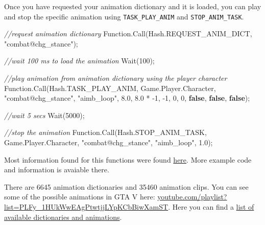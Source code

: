 \documentclass[
  openany]{book}
\newenvironment{Shaded}{\begin{snugshade}}{\end{snugshade}}
\newcommand{\CommentTok}[1]{\textcolor[rgb]{0.56,0.35,0.01}{\textit{#1}}}
\newcommand{\DecValTok}[1]{\textcolor[rgb]{0.00,0.00,0.81}{#1}}
\newcommand{\FloatTok}[1]{\textcolor[rgb]{0.00,0.00,0.81}{#1}}
\newcommand{\FunctionTok}[1]{\textcolor[rgb]{0.00,0.00,0.00}{#1}}
\newcommand{\KeywordTok}[1]{\textcolor[rgb]{0.13,0.29,0.53}{\textbf{#1}}}
\newcommand{\NormalTok}[1]{#1}
\newcommand{\StringTok}[1]{\textcolor[rgb]{0.31,0.60,0.02}{#1}}
\begin{document}
Once you have requested your animation dictionary and it is loaded, you can play and stop the specific animation using \texttt{TASK\_PLAY\_ANIM} and \texttt{STOP\_ANIM\_TASK}.

\begin{Shaded}
\begin{Highlighting}[]
\CommentTok{//request animation dictionary}
\NormalTok{Function.}\FunctionTok{Call}\NormalTok{(Hash.}\FunctionTok{REQUEST_ANIM_DICT}\NormalTok{, }\StringTok{"combat@chg_stance"}\NormalTok{);}
 
\CommentTok{//wait 100 ms to load the animation}
\FunctionTok{Wait}\NormalTok{(}\DecValTok{100}\NormalTok{);}
 
\CommentTok{//play animation from animation dictionary using the player character}
\NormalTok{Function.}\FunctionTok{Call}\NormalTok{(Hash.}\FunctionTok{TASK_PLAY_ANIM}\NormalTok{, Game.}\FunctionTok{Player}\NormalTok{.}\FunctionTok{Character}\NormalTok{, }\StringTok{"combat@chg_stance"}\NormalTok{, }\StringTok{"aimb_loop"}\NormalTok{, }\FloatTok{8.0}\NormalTok{, }\FloatTok{8.0}\NormalTok{ * }\DecValTok{-1}\NormalTok{, }\DecValTok{-1}\NormalTok{, }\DecValTok{0}\NormalTok{, }\DecValTok{0}\NormalTok{, }\KeywordTok{false}\NormalTok{, }\KeywordTok{false}\NormalTok{, }\KeywordTok{false}\NormalTok{);}
 
\CommentTok{//wait 5 secs}
\FunctionTok{Wait}\NormalTok{(}\DecValTok{5000}\NormalTok{);}
 
\CommentTok{//stop the animation}
\NormalTok{Function.}\FunctionTok{Call}\NormalTok{(Hash.}\FunctionTok{STOP_ANIM_TASK}\NormalTok{, Game.}\FunctionTok{Player}\NormalTok{.}\FunctionTok{Character}\NormalTok{, }\StringTok{"combat@chg_stance"}\NormalTok{, }\StringTok{"aimb_loop"}\NormalTok{, }\FloatTok{1.0}\NormalTok{);}
\end{Highlighting}
\end{Shaded}

Most information found for this functions were found \href{Source:\%20http://gtaxscripting.blogspot.com/2016/06/tut-gta-v-playing-and-handling.html}{here}. More example code and information is avaiable there.

There are 6645 animation dictionaries and 35460 animation clips. You can see some of the possible animations in GTA V here: \href{https://www.youtube.com/playlist?list=PLFy_1HUkWwEAgPtwtjjLYpKCbBiwXamST}{youtube.com/playlist?list=PLFy\_1HUkWwEAgPtwtjjLYpKCbBiwXamST}.
Here you can find a \href{https://docs.ragepluginhook.net/html/62951c37-a440-478c-b389-c471230ddfc5.htm}{list of available dictionaries and animations}.
\end{document}
